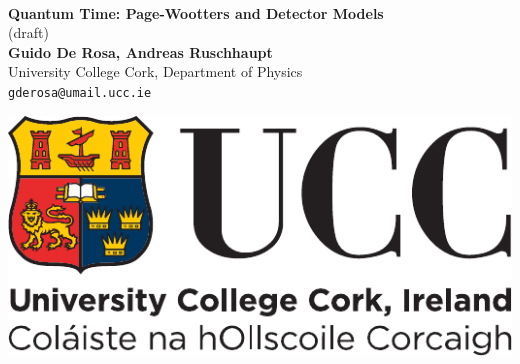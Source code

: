 \documentclass[a0,portrait]{a0poster}
\begin{document}
\begin{minipage}[c]{0.75\linewidth}%
\Huge\color{NavyBlue}\textbf{\\[1.0cm]Quantum Time: Page-Wootters and Detector Models}
  \\ {\normalsize (draft)}
  \color{Black}
  \\[1cm]
  \Large \textbf{Guido De Rosa, Andreas Ruschhaupt}\\[0.5cm] %
  \Large University College Cork, Department of Physics\\[0.4cm] %
  \large%
  \texttt{gderosa@umail.ucc.ie}
\end{minipage}%
%
\begin{minipage}[c]{0.25\linewidth}
  \hspace{0.7cm}\includegraphics[width=17cm]{ucc_logo.pdf}\\  %
\end{minipage}

\vspace{1cm} %

\end{document}

